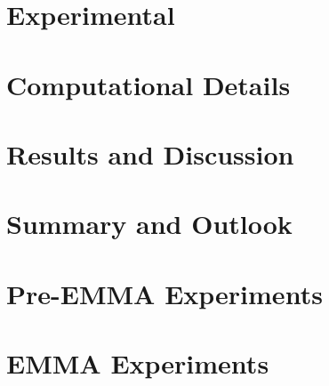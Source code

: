 \documentclass[a4paper,twoside,draft]{report}
\begin{document}
\chapter{Experimental}
\label{sec:exp}


\newpage
\chapter{Computational Details}
\label{sec:comp}


\chapter{Results and Discussion}
\label{sec:results}





\chapter{Summary and Outlook}
\label{sec:outlook}



%


\clearpage

\appendix
%
\chapter{Pre-EMMA Experiments}
\label{sec:app-pre-emma}

%
\chapter{EMMA Experiments}
\label{sec:app-emma}

%
\end{document}
